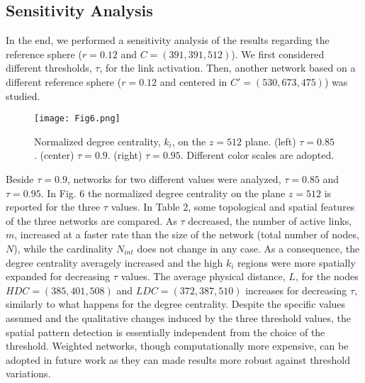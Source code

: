 \documentclass{ws-ijbc}
\begin{document}
\subsection{Sensitivity Analysis}

In the end, we performed a sensitivity analysis of the results regarding the reference sphere ($r=0.12$ and $C=(391,391,512)$). We first considered different thresholds, $\tau$, for the link activation. Then, another network based on a different reference sphere ($r=0.12$ and centered in $C'=(530,673,475)$) was studied.

\begin{figure}[h]
\texttt{[image: Fig6.png]}
\caption{Normalized degree centrality, $k_i$, on the $z=512$ plane. (left) $\tau=0.85$. (center) $\tau=0.9$. (right) $\tau=0.95$. Different color scales are adopted.}
\end{figure}

Beside $\tau=0.9$, networks for two different values were analyzed, $\tau=0.85$ and $\tau=0.95$. In Fig. 6 the normalized degree centrality on the plane $z=512$ is reported for the three $\tau$ values. In Table 2, some topological and spatial features of the three networks are compared. As $\tau$ decreased, the number of active links, $m$, increased at a faster rate than the size of the network (total number of nodes, $N$), while the cardinality $N_{int}$ does not change in any case. As a consequence, the degree centrality averagely increased and the high $k_i$ regions were more spatially expanded for decreasing $\tau$ values. The average physical distance, $L$, for the nodes $HDC=(385,401,508)$ and $LDC=(372,387,510)$ increases for decreasing $\tau$, similarly to what happens for the degree centrality. Despite the specific values assumed and the qualitative changes induced by the three threshold values, the spatial pattern detection is essentially independent from the choice of the threshold. Weighted networks, though computationally more expensive, can be adopted in future work as they can made results more robust against threshold variations.
\end{document}
